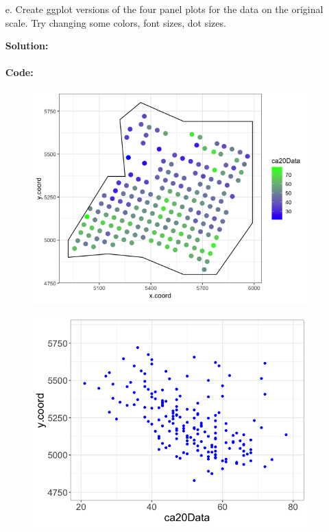 \documentclass[12pt]{article}
\makeatletter
\theoremstyle{homework}
\newenvironment{exercise}[1]
{\def\@currentlabel{#1}\exercisecore}
{\endexercisecore}
\newcommand{\localhead}[1]{\par\smallskip\noindent\textbf{#1}\nobreak\\}%
\newcommand\solution{\localhead{Solution:}}
\makeatother
\begin{document}
\begin{exercise}{2}
\begin{enumerate}
        \item[e.] Create ggplot versions of the four panel plots for the data on the original scale. Try changing some colors, font sizes, dot sizes.\\
        \solution\\
        \textbf{Code:}
        \begin{center}
        
        \end{center}
        \begin{figure}[H]
          \begin{center}
          \includegraphics[width = .75\textwidth]{Rplot2.png}
          \end{center}
        \end{figure}
        \begin{figure}[H]
          \begin{center}
          \includegraphics[width = .75\textwidth]{Rplot3.png}
          \end{center}
        \end{figure}
        \begin{figure}[H]

\end{figure}
\end{enumerate}
\end{exercise}
\end{document}
